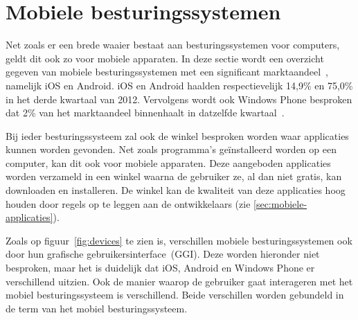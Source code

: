 
\section{Mobiele besturingssystemen}
\label{sec:mobiele-besturingssystemen}
Net zoals er een brede waaier bestaat aan besturingssystemen voor computers, geldt dit ook zo voor mobiele apparaten. 
In deze sectie wordt een overzicht gegeven van mobiele besturingssystemen met een significant marktaandeel~\cite{David2011, Hales2012}, namelijk iOS en Android.
iOS en Android haalden respectievelijk 14,9\% en 75,0\% in het derde kwartaal van 2012.
Vervolgens wordt ook Windows Phone besproken dat 2\% van het marktaandeel binnenhaalt in datzelfde kwartaal~\cite{Protalinski2012}.

Bij ieder besturingssysteem zal ook de winkel besproken worden waar applicaties kunnen worden gevonden.
Net zoals programma's geïnstalleerd worden op een computer, kan dit ook voor mobiele apparaten.
Deze aangeboden applicaties worden verzameld in een winkel waarna de gebruiker ze, al dan niet gratis, kan downloaden en installeren.
De winkel kan de kwaliteit van deze applicaties hoog houden door regels op te leggen aan de ontwikkelaars (zie \ref{sec:mobiele-applicaties}).

Zoals op figuur~\ref{fig:devices} te zien is, verschillen mobiele besturingssystemen ook door hun grafische gebruikersinterface~(GGI).
Deze worden hieronder niet besproken, maar het is duidelijk dat iOS, Android en Windows Phone er verschillend uitzien.
Ook de manier waarop de gebruiker gaat interageren met het mobiel besturingssysteem is verschillend.
Beide verschillen worden gebundeld in de term  van het mobiel besturingssysteem.

\begin{table}
\centering
{}
\quad
{}
\caption{Marktaandeel van iOS-versies op 8~mei~2013 en Android-versies op 1~mei~2013.  \protect\cite{Smith2013,Android2013}.}
\label{tabel:marktaandeel-ios-android}
\end{table}

